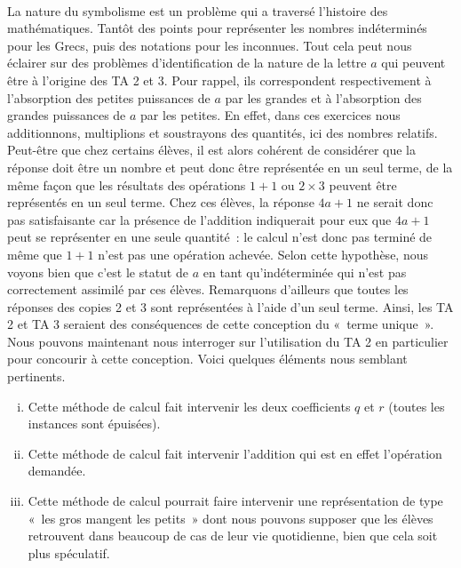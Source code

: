 \documentclass{report}
\theoremstyle{definition}
\begin{document}
\paragraph*{}

La nature du symbolisme est un problème qui a traversé l'histoire des mathématiques. Tantôt des points pour représenter les nombres indéterminés pour les Grecs, puis des notations pour les inconnues. Tout cela peut nous éclairer sur des problèmes d'identification de la nature de la lettre $a$ qui peuvent être à l'origine des TA 2 et 3. Pour rappel, ils correspondent respectivement à l'absorption des petites puissances de $a$ par les grandes et à l'absorption des grandes puissances de $a$ par les petites. En effet, dans ces exercices nous additionnons, multiplions et soustrayons des quantités, ici des nombres relatifs. Peut-être que chez certains élèves, il est alors cohérent de considérer que la réponse doit être un nombre et peut donc être représentée en un seul terme, de la même façon que les résultats des opérations $1+1$ ou $2\times 3$ peuvent être représentés en un seul terme. Chez ces élèves, la réponse $4a+1$ ne serait donc pas satisfaisante car la présence de l'addition indiquerait pour eux que $4a+1$ peut se représenter en une seule quantité~: le calcul n'est donc pas terminé de même que $1+1$ n'est pas une opération achevée. Selon cette hypothèse, nous voyons bien que c'est le statut de $a$ en tant qu'indéterminée qui n'est pas correctement assimilé par ces élèves.
Remarquons d'ailleurs que toutes les réponses des copies 2 et 3 sont représentées à l'aide d'un seul terme. Ainsi, les TA 2 et TA 3 seraient des conséquences de cette conception du «~terme unique~». Nous pouvons maintenant nous interroger sur l'utilisation du TA 2 en particulier pour concourir à cette conception. Voici quelques éléments nous semblant pertinents.

\begin{enumerate}[i)]
\item Cette méthode de calcul fait intervenir les deux coefficients $q$ et $r$ (toutes les instances sont épuisées).
\item Cette méthode de calcul fait intervenir l'addition qui est en effet l'opération demandée.
\item Cette méthode de calcul pourrait faire intervenir une représentation de type «~les gros mangent les petits~» dont nous pouvons supposer que les élèves retrouvent dans beaucoup de cas de leur vie quotidienne, bien que cela soit plus spéculatif.
\end{enumerate} 
\end{document}
